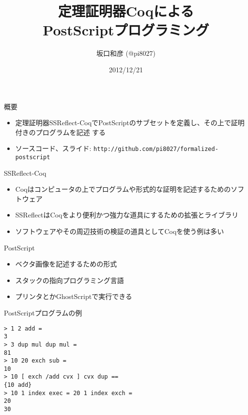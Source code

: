 \documentclass[cjk, 14pt, dvipdfm]{beamer}
\title{定理証明器Coqによる\\PostScriptプログラミング}
\author{坂口和彦 (@pi8027)}
\institute{情報科学類 B2}
\date{2012/12/21}
\begin{document}
\begin{frame}[plain]

 \maketitle

\end{frame}

\begin{frame}{概要}

 \begin{itemize}
  \item 定理証明器SSReflect-CoqでPostScriptのサブセットを定義し、その上で証明付きのプログラムを記述
	する
  \item ソースコード、スライド: \small\texttt{http://github.com/pi8027/formalized-postscript}
 \end{itemize}

\end{frame}

\begin{frame}{SSReflect-Coq}

 \begin{itemize}
  \item Coqはコンピュータの上でプログラムや形式的な証明を記述するためのソフトウェア
  \item SSReflectはCoqをより便利かつ強力な道具にするための拡張とライブラリ
  \item ソフトウェアやその周辺技術の検証の道具としてCoqを使う例は多い
 \end{itemize}

\end{frame}

\begin{frame}{PostScript}

 \begin{itemize}
  \item ベクタ画像を記述するための形式
  \item スタックの指向プログラミング言語
  \item プリンタとかGhostScriptで実行できる
 \end{itemize}

\end{frame}

\begin{frame}[fragile]{PostScriptプログラムの例}

\begin{lstlisting}[style=postscript]
> 1 2 add =
3
> 3 dup mul dup mul =
81
> 10 20 exch sub =
10
> 10 [ exch /add cvx ] cvx dup ==
{10 add}
> 10 1 index exec = 20 1 index exch =
20
30
\end{lstlisting}

\end{frame}
\end{document}
